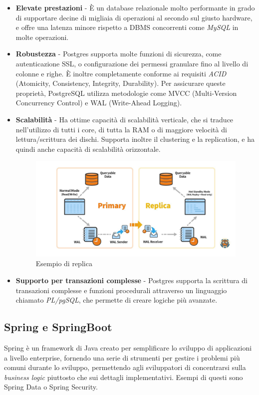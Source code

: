 \begin{itemize}
  \item \textbf{Elevate prestazioni} - \`E un database relazionale molto performante in grado di supportare decine di migliaia di operazioni al secondo sul giusto hardware,
    e offre una latenza minore rispetto a DBMS concorrenti come \textit{MySQL} in molte operazioni.\cite{salunke2024performance}
  \item \textbf{Robustezza} - Postgres supporta molte funzioni di sicurezza, come autenticazione SSL, o configurazione dei permessi granulare fino al
    livello di colonne e righe.
    \`E inoltre completamente conforme ai requisiti \textit{ACID} (Atomicity, Consistency, Integrity, Durability).
    Per assicurare queste propriet\`a, PostgreSQL utilizza metodologie come MVCC (Multi-Version Concurrency Control) e WAL (Write-Ahead Logging).
  \item \textbf{Scalabilit\`a} - Ha ottime capacit\`a di scalabilit\`a verticale, che si traduce nell'utilizzo di tutti i core,
    di tutta la RAM o di maggiore velocit\`a di lettura/scrittura dei dischi.
    Supporta inoltre il clustering e la replication, e ha quindi anche capacit\`a di scalabilit\`a orizzontale.
    \begin{figure}[H]
      \centering
      \includegraphics[width=15cm]{images/postgres-replication.png}
      \caption{Esempio di replica\cite{postgreshighavail}}
    \end{figure}
  \item \textbf{Supporto per transazioni complesse} - Postgres supporta la scrittura di transazioni complesse e funzioni procedurali attraverso un linguaggio chiamato
    \textit{PL/pgSQL}, che permette di creare logiche pi\`u avanzate.
\end{itemize}
\subsection {Spring e SpringBoot}
Spring \`e un framework di Java creato per semplificare lo sviluppo di applicazioni a livello enterprise, fornendo una serie di strumenti per gestire i problemi pi\`u comuni
durante lo sviluppo, permettendo agli sviluppatori di concentrarsi sulla \textit{business logic} piuttosto che sui dettagli implementativi.
Esempi di questi sono Spring Data o Spring Security.

